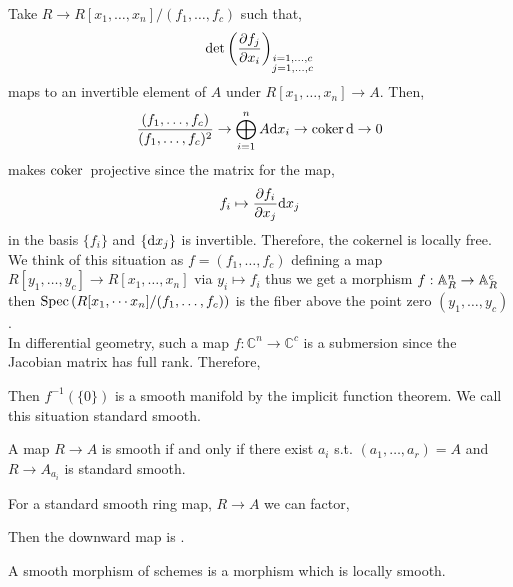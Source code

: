 \documentclass[12pt]{article}
\begin{document}
\begin{example}
Take $R \to R[x_1, \dots, x_n] / (f_1, \dots, f_c)$ such that,
\[ \det{ \left( \frac{\partial{f_j}}{\partial{x_i}} \right)_{\substack{i = 1, \dots, c \\ j = 1, \dots, c} }} \]
maps to an invertible element of $A$ under $R[x_1, \dots, x_n] \to A$. 
Then,
\[ \frac{(f_1, \dots, f_c)}{(f_1, \dots, f_c)^2} \to \bigoplus_{i = 1}^n A \mathrm{d}{x_i} \to \operatorname{\mathrm{coker}}{\mathrm{d}} \to 0 \]
makes $\operatorname{\mathrm{coker}}{}$ projective since the matrix for the map,
\[ f_i \mapsto \frac{\partial{f_i}}{\partial{x_j}} \mathrm{d}{x_j} \]
in the basis $\{ f_i \}$ and $\{ \mathrm{d}{x_j} \}$ is invertible. Therefore, the cokernel is locally free. We think of this situation as $f = (f_1, \dots, f_c)$ defining a map $R[y_1, \dots, y_c] \to R[x_1, \dots, x_n]$ via $y_i \mapsto f_i$ thus we get a morphism $f : \mathbb{A}^n_R \to \mathbb{A}^c_R$ then $\mathrm{Spec}\left( R[x_1, \dotsm x_n]/(f_1, \dots, f_c) \right)$ is the fiber above the point zero $(y_1, \dots, y_c)$. 
\bigskip\\ 
In differential geometry, such a map $f : \mathbb{C}^n \to \mathbb{C}^{c}$ is a submersion since the Jacobian matrix has full rank. Therefore,
\begin{center}
\end{center}
Then $f^{-1}(\{ 0 \})$ is a smooth manifold by the implicit function theorem. We call this situation standard smooth.
\end{example}

\begin{lemma}
A map $R \to A$ is smooth if and only if there exist $a_i$ s.t. $(a_1, \dots, a_r) = A$ and $R \to A_{a_i}$ is standard smooth.
\end{lemma}

\begin{defn}
For a standard smooth ring map, $R \to A$ we can factor,
\begin{center}
\end{center}
Then the downward map is \etale.
\end{defn}

\begin{defn}
A smooth morphism of schemes is a morphism which is locally smooth. 
\end{defn}
\end{document}

